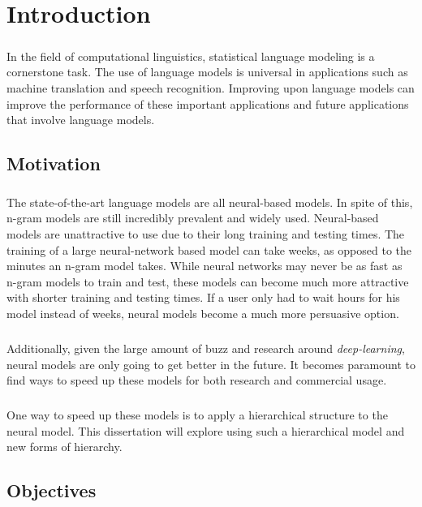 
\chapter{Introduction}
\paragraph{}
In the field of computational linguistics, statistical language modeling is a cornerstone task. The use of language models  is universal in applications such as machine translation and speech recognition.  Improving upon language models can improve the performance of these important applications and future applications that involve language models.
\section{Motivation}
\paragraph{}
The state-of-the-art language models are all neural-based models. In spite of this, n-gram models are still incredibly prevalent and widely used. Neural-based models are unattractive to use due to their long training and testing times. The training of a large neural-network based model can take weeks, as opposed to the minutes an n-gram model takes. While neural networks may never be as fast as n-gram models to train and test, these models can become much more attractive with shorter training and testing times. If a user only had to wait hours for his model instead of weeks, neural models become a much more persuasive option.
\paragraph{}
Additionally, given the large amount of buzz and research around \emph{deep-learning}, neural models are only going to get better in the future. It becomes paramount to find ways to speed up these models for both research and commercial usage.
\paragraph{}
One way to speed up these models is to apply a hierarchical structure to the neural model. This dissertation will explore using such a hierarchical model and new forms of hierarchy.

\section{Objectives}
